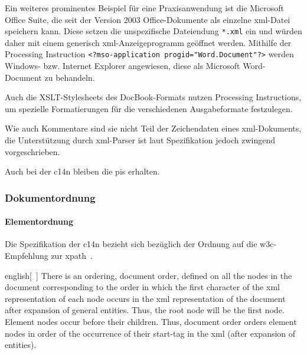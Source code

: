 Ein weiteres prominentes Beispiel für eine Praxisanwendung ist die Microsoft Office Suite, die seit der Version 2003 Office-Dokumente als einzelne \acrshort{xml}-Datei speichern kann. Diese setzen die unspezifische Dateiendung \texttt{*.xml} ein und würden daher mit einem generisch \acrshort{xml}-Anzeigeprogramm geöffnet werden. Mithilfe der Processing Instruction \texttt{<?mso-application progid="Word.Document"?>} werden Windows- bzw. Internet Explorer angewiesen, diese als Microsoft Word-Document zu behandeln.~\cite[Abschnitt 3.2]{tverskov2008understandingpi}

Auch die XSLT-Stylesheets des DocBook-Formats nutzen Processing Instructions, um spezielle Formatierungen für die verschiedenen Ausgabeformate festzulegen.~\cite[{Kapitel \enquote{User Reference: PIs}}]{docbookxsl}

Wie auch Kommentare sind sie nicht Teil der Zeichendaten eines \acrshort{xml}-Dokuments, die Unterstützung durch \acrshort{xml}-Parser ist laut Spezifikation jedoch zwingend vorgeschrieben.

Auch bei der \acrlong{c14n} bleiben die \glspl{pi} erhalten.~\cite[Abschnitt 2.3]{boyer2001c14n}

\subsubsection{Dokumentordnung}

\paragraph{Elementordnung}

Die Spezifikation der \acrshort{c14n} bezieht sich bezüglich der Ordnung auf die \acrshort{w3c}-Empfehlung zur \acrfull{xpath}~\cite[Abschnitt~2.2]{boyer2001c14n}.

\begin{foreigndisplayquote}{english}[{~\cite[Abschnitt~5]{clark1999xpath1}}]
    There is an ordering, document order, defined on all the nodes in the document corresponding to the order in which the first character of the \acrshort{xml} representation of each node occurs in the \acrshort{xml} representation of the document after expansion of general entities. Thus, the root node will be the first node. Element nodes occur before their children. Thus, document order orders element nodes in order of the occurrence of their start-tag in the \acrshort{xml} (after expansion of entities).
\end{foreigndisplayquote}

